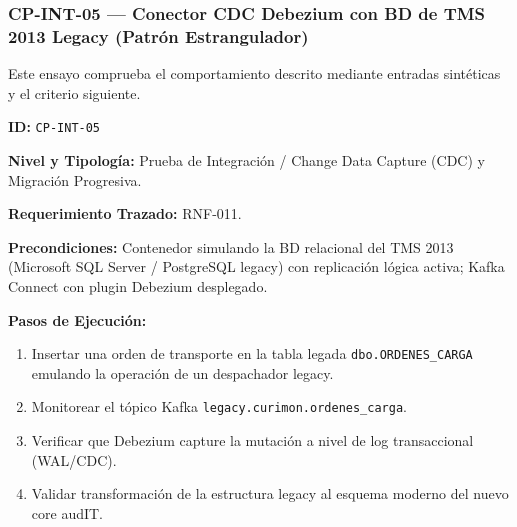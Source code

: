 \subsubsection*{CP-INT-05 — Conector CDC Debezium con BD de TMS 2013 Legacy (Patrón Estrangulador)}\label{sec:9-cp-int-05}
Este ensayo comprueba el comportamiento descrito mediante entradas sintéticas y el criterio siguiente.

\par\noindent\textbf{ID:} \texttt{C\allowbreak{}P\allowbreak{}-\allowbreak{}I\allowbreak{}N\allowbreak{}T\allowbreak{}-\allowbreak{}0\allowbreak{}5\allowbreak{}}\par
\par\noindent\textbf{Nivel y Tipología:} Prueba de Integración / Change Data Capture (CDC) y Migración Progresiva.\par
\par\noindent\textbf{Requerimiento Trazado:} RNF-011.\par
\par\noindent\textbf{Precondiciones:} Contenedor simulando la BD relacional del TMS 2013 (Microsoft SQL Server / PostgreSQL legacy) con replicación lógica activa; Kafka Connect con plugin Debezium desplegado.\par
\par\noindent\textbf{Pasos de Ejecución:} \par
\begin{enumerate}
\item Insertar una orden de transporte en la tabla legada \texttt{d\allowbreak{}b\allowbreak{}o\allowbreak{}.\allowbreak{}O\allowbreak{}R\allowbreak{}D\allowbreak{}E\allowbreak{}N\allowbreak{}E\allowbreak{}S\allowbreak{}\_\allowbreak{}C\allowbreak{}A\allowbreak{}R\allowbreak{}G\allowbreak{}A\allowbreak{}} emulando la operación de un despachador legacy.
\item Monitorear el tópico Kafka \texttt{l\allowbreak{}e\allowbreak{}g\allowbreak{}a\allowbreak{}c\allowbreak{}y\allowbreak{}.\allowbreak{}c\allowbreak{}u\allowbreak{}r\allowbreak{}i\allowbreak{}m\allowbreak{}o\allowbreak{}n\allowbreak{}.\allowbreak{}o\allowbreak{}r\allowbreak{}d\allowbreak{}e\allowbreak{}n\allowbreak{}e\allowbreak{}s\allowbreak{}\_\allowbreak{}c\allowbreak{}a\allowbreak{}r\allowbreak{}g\allowbreak{}a\allowbreak{}}.
\item Verificar que Debezium capture la mutación a nivel de log transaccional (WAL/CDC).
\item Validar transformación de la estructura legacy al esquema moderno del nuevo core audIT.
\end{enumerate}
